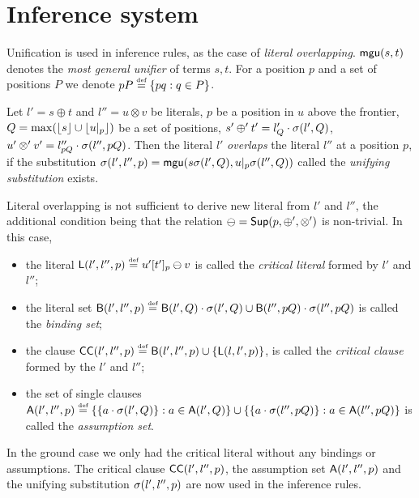\section{Inference system}\label{se:reasoning}
%
%
Unification is used in inference rules, as the
case of {\em literal overlapping}.  \({\sf mgu}(s,t)\) denotes the {\em most
general unifier} of terms $s,t$.  For a position $p$ and a set of
positions $P$ we denote \(pP\mathrel {\stackrel {\mbox {\tiny def}}{=}} \{pq: q\in P\}\).

\begin{definition}\label {def:literal-overalap}
Let \(l'=s\oplus t\) and \(l''=u \otimes v\) be literals, $p$ be a position
in $u$ above the frontier, \(Q=\max(\lfloor s\rfloor \cup \lfloor u|_{p}\rfloor)\) be a set of positions, \( s'\oplus' t' = l'_Q \cdot \sigma(l',Q)\),
\(u'\otimes' v' = l''_{pQ} \cdot \sigma(l'',pQ)\).  Then the literal $l'$
{\em overlaps} the literal $l''$ at a position $p$, if the substitution
\(\sigma(l',l'',p) ={\sf mgu} (s\sigma(l',Q), u|_{p}\sigma(l'',Q))\)
called the {\em unifying substitution} exists.
\end{definition}

Literal overlapping is not sufficient to derive new literal from $l'$ and
$l''$, the additional condition being that the relation \(\ominus
=\mbox {\sf Sup}(p ,\oplus' ,\otimes')\) is non-trivial.  In this case,
\begin{itemize}\smallerspaces
\item the literal \({\sf L} (l',l'',p)\mathrel {\stackrel {\mbox {\tiny def}}{=}} u'[t']_p\ominus v\) is called the {\em
    critical literal} formed by  \(l'\) and \(l''\); 
\item the literal set \({\sf B}(l',l'',p)\mathrel {\stackrel {\mbox {\tiny def}}{=}} {\sf B}(l',Q) \cdot \sigma(l',Q )\cup
   {\sf B}(l'',pQ) \cdot \sigma(l'',pQ)\) is called the {\em binding set};
\item the clause \({\sf CC}(l',l'',p)\mathrel {\stackrel {\mbox {\tiny def}}{=}} {\sf B}(l',l'',p) \cup \{{\sf L} (l,l',p)\}\), 
   is called the {\em critical clause} formed by the  \(l'\) and \(l''\);
\item the set of single clauses \({\sf A}(l',l'',p)\mathrel {\stackrel {\mbox {\tiny def}}{=}} \{\{a \cdot \sigma(l',Q)\}:
   a\in{\sf A}(l',Q)\} \cup \{\{a \cdot \sigma(l'',pQ)\}: a\in{\sf A}(l'',pQ)\}\) is
   called the {\em assumption set}.
\end{itemize}
%
In the ground case \cite{KW} 
we only had the critical literal without any bindings or
assumptions.  The critical clause \({\sf CC}(l',l'',p)\), the assumption set
\({\sf A}(l',l'',p)\) and the unifying substitution \(\sigma(l',l'',p)\) are
now used in the  inference rules.

